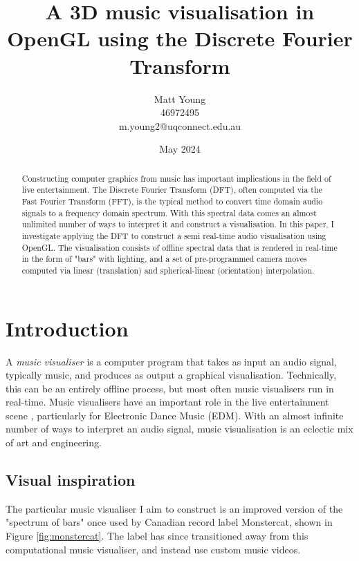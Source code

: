 \documentclass[11pt]{article}
\title{\textbf{A 3D music visualisation in OpenGL using the Discrete Fourier Transform}}
\author{Matt Young \\ 46972495 \\ m.young2@uqconnect.edu.au}
\date{May 2024}
\begin{document}
\maketitle

\begin{abstract}
    Constructing computer graphics from music has important implications in the field of live entertainment.
    The Discrete Fourier Transform (DFT), often computed via the Fast Fourier Transform (FFT), is the typical
    method to convert time domain audio signals to a frequency domain spectrum. With this spectral data comes
    an almost unlimited number of ways to interpret it and construct a visualisation. In this paper, I
    investigate applying the DFT to construct a semi real-time audio visualisation using OpenGL. The
    visualisation consists of offline spectral data that is rendered in real-time in the form of "bars" with
    lighting, and a set of pre-programmed camera moves computed via linear (translation) and
    spherical-linear (orientation) interpolation.
\end{abstract}

\tableofcontents

\clearpage
\listoffigures
\clearpage

\section{Introduction}

A \textit{music visualiser} is a computer program that takes as input an audio signal, typically music, and
produces as output a graphical visualisation. Technically, this can be an entirely offline process, but most
often music visualisers run in real-time. Music visualisers have an important role in the live entertainment
scene \cite{mccarthy2022live}, particularly for Electronic Dance Music (EDM). With an almost infinite number
of ways to interpret an audio signal, music visualisation is an eclectic mix of art and engineering.

\subsection{Visual inspiration}
The particular music visualiser I aim to construct is an improved version of the "spectrum of bars" once used
by Canadian record label Monstercat, shown in Figure \ref{fig:monstercat}.
The label has since transitioned away
from this computational music visualiser, and instead use custom music videos.
\end{document}
